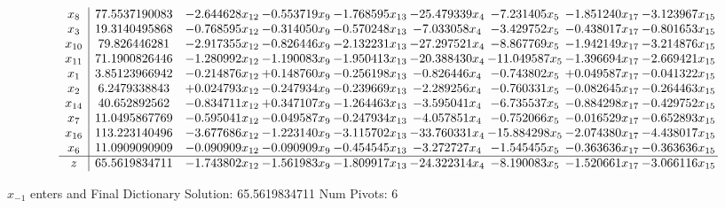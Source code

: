 \documentclass[10pt]{article}
\begin{document}
 \[\begin{array}{c| c c@{\hskip 2pt} c@{\hskip 2pt} c@{\hskip 2pt} c@{\hskip 2pt} c@{\hskip 2pt} c@{\hskip 2pt} c@{\hskip 2pt} }
 x_{8}   &  77.5537190083 & -2.644628 x_{12} & -0.553719 x_{9} & -1.768595 x_{13} & -25.479339 x_{4} & -7.231405 x_{5} & -1.851240 x_{17} & -3.123967 x_{15}\\
 x_{3}   &  19.3140495868 & -0.768595 x_{12} & -0.314050 x_{9} & -0.570248 x_{13} & -7.033058 x_{4} & -3.429752 x_{5} & -0.438017 x_{17} & -0.801653 x_{15}\\
 x_{10}   &  79.826446281 & -2.917355 x_{12} & -0.826446 x_{9} & -2.132231 x_{13} & -27.297521 x_{4} & -8.867769 x_{5} & -1.942149 x_{17} & -3.214876 x_{15}\\
 x_{11}   &  71.1900826446 & -1.280992 x_{12} & -1.190083 x_{9} & -1.950413 x_{13} & -20.388430 x_{4} & -11.049587 x_{5} & -1.396694 x_{17} & -2.669421 x_{15}\\
 x_{1}   &  3.85123966942 & -0.214876 x_{12} & + 0.148760 x_{9} & -0.256198 x_{13} & -0.826446 x_{4} & -0.743802 x_{5} & + 0.049587 x_{17} & -0.041322 x_{15}\\
 x_{2}   &  6.2479338843 & + 0.024793 x_{12} & -0.247934 x_{9} & -0.239669 x_{13} & -2.289256 x_{4} & -0.760331 x_{5} & -0.082645 x_{17} & -0.264463 x_{15}\\
 x_{14}   &  40.652892562 & -0.834711 x_{12} & + 0.347107 x_{9} & -1.264463 x_{13} & -3.595041 x_{4} & -6.735537 x_{5} & -0.884298 x_{17} & -0.429752 x_{15}\\
 x_{7}   &  11.0495867769 & -0.595041 x_{12} & -0.049587 x_{9} & -0.247934 x_{13} & -4.057851 x_{4} & -0.752066 x_{5} & -0.016529 x_{17} & -0.652893 x_{15}\\
 x_{16}   &  113.223140496 & -3.677686 x_{12} & -1.223140 x_{9} & -3.115702 x_{13} & -33.760331 x_{4} & -15.884298 x_{5} & -2.074380 x_{17} & -4.438017 x_{15}\\
 x_{6}   &  11.0909090909 & -0.090909 x_{12} & -0.090909 x_{9} & -0.454545 x_{13} & -3.272727 x_{4} & -1.545455 x_{5} & -0.363636 x_{17} & -0.363636 x_{15}\\
\hline
z    &  65.5619834711 & -1.743802 x_{12} & -1.561983 x_{9} & -1.809917 x_{13} & -24.322314 x_{4} & -8.190083 x_{5} & -1.520661 x_{17} & -3.066116 x_{15}\\
\end{array}\]


 $ x_{-1} $ enters and Final Dictionary
Solution:  65.5619834711
Num Pivots:  6
\end{document}
